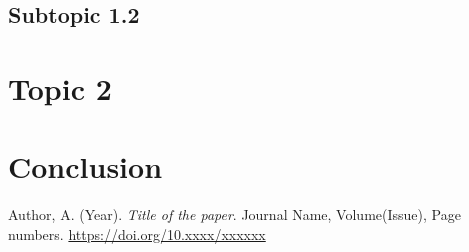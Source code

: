 \documentclass{article}
\begin{document}
\subsection{Subtopic 1.2}

\section{Topic 2}

\section{Conclusion}

\begin{thebibliography}{9}
Author, A. (Year). \textit{Title of the paper}. Journal Name, Volume(Issue), Page numbers. \url{https://doi.org/10.xxxx/xxxxxx}
\end{thebibliography}
\end{document}
